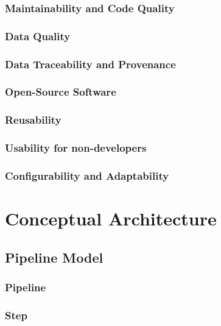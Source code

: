 \subsubsection{Maintainability and Code Quality}
\label{NFR1}

\subsubsection{Data Quality}
\label{NFR2}

\subsubsection{Data Traceability and Provenance}
\label{NFR3}

\subsubsection{Open-Source Software}
\label{NFR4}

\subsubsection{Reusability}
\label{NFR5}

\subsubsection{Usability for non-developers}
\label{NFR6}

\subsubsection{Configurability and Adaptability}
\label{NFR7}

\section{Conceptual Architecture}

\subsection{Pipeline Model}

\subsubsection{Pipeline}

\subsubsection{Step}

